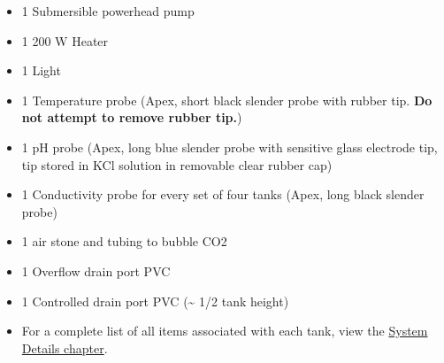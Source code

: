 \documentclass[
]{book}
\providecommand{\tightlist}{%
  \setlength{\itemsep}{0pt}\setlength{\parskip}{0pt}}
\begin{document}
\begin{itemize}
\tightlist
\item
  1 Submersible powerhead pump
\item
  1 200 W Heater
\item
  1 Light
\item
  1 Temperature probe (Apex, short black slender probe with rubber tip. \textbf{Do not attempt to remove rubber tip.})
\item
  1 pH probe (Apex, long blue slender probe with sensitive glass electrode tip, tip stored in KCl solution in removable clear rubber cap)
\item
  1 Conductivity probe for every set of four tanks (Apex, long black slender probe)
\item
  1 air stone and tubing to bubble CO2
\item
  1 Overflow drain port PVC
\item
  1 Controlled drain port PVC (\textasciitilde{} 1/2 tank height)
\item
  For a complete list of all items associated with each tank, view the \href{03-system_details.rmd}{System Details chapter}.
\end{itemize}
\end{document}
